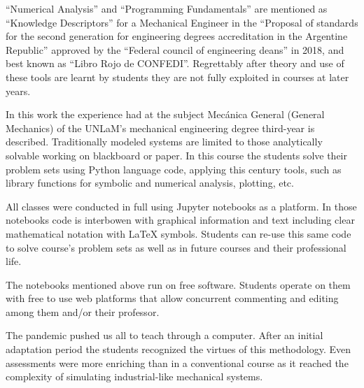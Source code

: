 “Numerical Analysis” and “Programming Fundamentals'' are mentioned as “Knowledge Descriptors'' for a Mechanical Engineer in the “Proposal of standards for the second generation for engineering degrees accreditation in the Argentine Republic” 
approved by the “Federal council of engineering deans” %
in 2018, and best known as “Libro Rojo de CONFEDI”\cite{librorojo}. 
Regrettably after theory and use of these tools are learnt by students they are not fully exploited in courses at later years.

In this work the experience had at the subject Mecánica General (General Mechanics) of the UNLaM’s mechanical engineering degree third-year is described. Traditionally modeled systems are limited to those analytically solvable working on blackboard or paper. In this course the students solve their problem sets using Python language code, applying this century tools, such as library functions for symbolic and numerical analysis, plotting, etc.

All classes were conducted in full using Jupyter notebooks as a platform. In those notebooks code  is interbowen with graphical information and text including clear mathematical notation with LaTeX symbols. Students can re-use this same code to solve course’s problem sets as well as in future courses and their professional life.

The notebooks mentioned above run  on free software. Students operate on them with free to use web platforms that  allow concurrent commenting and editing among them and/or their professor.

The pandemic pushed us all to teach through a computer. After an initial adaptation period the students recognized the virtues of this methodology. Even assessments were more enriching than in a conventional course as it reached the complexity of simulating industrial-like mechanical systems.



